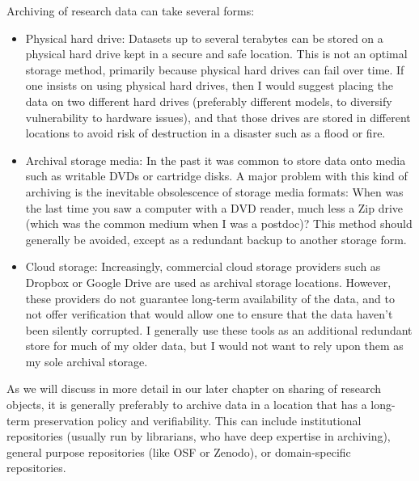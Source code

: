 Archiving of research data can take several forms:

\begin{itemize}
\item Physical hard drive: Datasets up to several terabytes can be stored on a physical hard drive kept in a secure and safe location.  This is not an optimal storage method, primarily because physical hard drives can fail over time. If one insists on using physical hard drives, then I would suggest placing the data on two different hard drives (preferably different models, to diversify vulnerability to hardware issues), and that those drives are stored in different locations to avoid risk of destruction in a disaster such as a flood or fire.
\item Archival storage media: In the past it was common to store data onto media such as writable DVDs or cartridge disks. A major problem with this kind of archiving is the inevitable obsolescence of storage media formats: When was the last time you saw a computer with a DVD reader, much less a Zip drive (which was the common medium when I was a postdoc)?  This method should generally be avoided, except as a redundant backup to another storage form.
\item Cloud storage: Increasingly, commercial cloud storage providers such as Dropbox or Google Drive are used as archival storage locations.  However, these providers do not guarantee long-term availability of the data, and to not offer verification that would allow one to ensure that the data haven't been silently corrupted.  I generally use these tools as an additional redundant store for much of my older data, but I would not want to rely upon them as my sole archival storage.
\end{itemize}

As we will discuss in more detail in our later chapter on sharing of research objects, it is generally preferably to archive data in a location that has a long-term preservation policy and verifiability.  This can include institutional repositories (usually run by librarians, who have deep expertise in archiving), general purpose repositories (like OSF or Zenodo), or domain-specific repositories.

